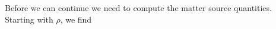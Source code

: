 \documentclass[12pt]{article}
\numberwithin{equation}{section}
\begin{document}
Before we can continue we need to compute the matter source quantities.  Starting with $\rho$, we find
\end{document}
